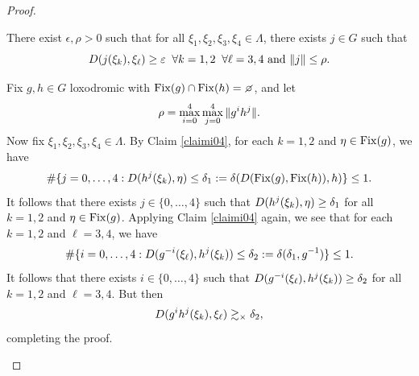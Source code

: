 \begin{proof}
\begin{claim}
\label{claimxi1234}
There exist $\epsilon,\rho > 0$ such that for all $\xi_1,\xi_2,\xi_3,\xi_4\in\Lambda$, there exists $j\in G$ such that
\begin{equation}
\label{xi1234}
D(j(\xi_k),\xi_\ell) \geq \varepsilon \;\;\forall k = 1,2 \;\;\forall \ell = 3,4 \textup{ and } \|j\| \leq \rho.
\end{equation}
\end{claim}
\begin{subproof}
Fix $g,h\in G$ loxodromic with $\Fix(g)\cap\Fix(h) = \emptyset$, and let
\[
\rho = \max_{i = 0}^4 \max_{j = 0}^4 \|g^i h^j\|.
\]
Now fix $\xi_1,\xi_2,\xi_3,\xi_4\in\Lambda$. By Claim \ref{claimi04}, for each $k = 1,2$ and $\eta\in\operatorname{Fix}(g)$, we have
\[
\#\{j = 0,\ldots,4 : D(h^j(\xi_k),\eta) \leq \delta_1 := \delta(D(\operatorname{Fix}(g),\operatorname{Fix}(h)),h)\} \leq 1.
\]
It follows that there exists $j\in\{0,\ldots,4\}$ such that $D(h^j(\xi_k),\eta) \geq \delta_1$ for all $k = 1,2$ and $\eta\in\operatorname{Fix}(g)$. Applying Claim \ref{claimi04} again, we see that for each $k = 1,2$ and $\ell = 3,4$, we have
\[
\#\{i = 0,\ldots,4 : D(g^{-i}(\xi_\ell),h^j(\xi_k)) \leq \delta_2 := \delta(\delta_1,g^{-1})\} \leq 1.
\]
It follows that there exists $i\in\{0,\ldots,4\}$ such that $D(g^{-i}(\xi_\ell),h^j(\xi_k)) \geq \delta_2$ for all $k = 1,2$ and $\ell = 3,4$. But then
\[
D(g^i h^j(\xi_k) , \xi_\ell) \gtrsim_\times \delta_2,
\]
completing the proof.
\end{subproof}


\end{proof}
